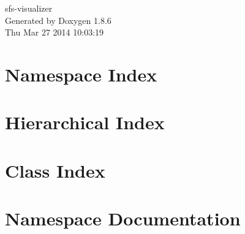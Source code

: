 \documentclass[twoside]{book}
\newcommand{\clearemptydoublepage}{%
  \newpage{\pagestyle{empty}\cleardoublepage}%
}
\begin{document}
\begin{titlepage}
\vspace*{7cm}
\begin{center}%
{\Large sfs-\/visualizer }\\
\vspace*{1cm}
{\large Generated by Doxygen 1.8.6}\\
\vspace*{0.5cm}
{\small Thu Mar 27 2014 10:03:19}\\
\end{center}
\end{titlepage}
\clearemptydoublepage
\tableofcontents
\clearemptydoublepage
{}

\chapter{Namespace Index}

\chapter{Hierarchical Index}

\chapter{Class Index}

\chapter{Namespace Documentation}

\end{document}
